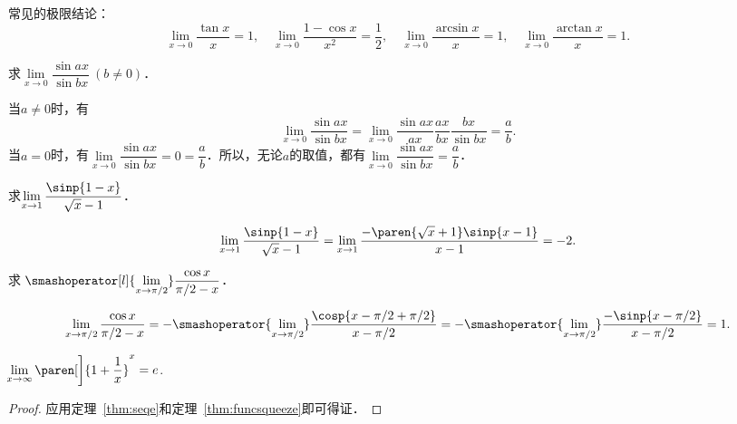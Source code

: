 \begin{example*}
  常见的极限结论：
  \begin{equation*}
    \lim_{x\to0} \frac{\tan x}{x} = 1,
    \quad
    \lim_{x\to0} \frac{1 - \cos x}{x^2} = \frac12,
    \quad
    \lim_{x\to0} \frac{\arcsin x}{x} = 1,
    \quad
    \lim_{x\to0} \frac{\arctan x}{x} = 1.
  \end{equation*}
\end{example*}

\begin{example*}
  求\(\lim\limits_{x\to0} \dfrac{\sin ax}{\sin bx}\ (b \ne 0)\)．

  \begin{remark}
    当\(a \ne 0\)时，有
    \begin{equation*}
      \lim_{x\to0} \frac{\sin ax}{\sin bx}
      = \lim_{x\to0} \frac{\sin ax}{ax} \frac{ax}{bx} \frac{bx}{\sin bx}
      = \frac ab.
    \end{equation*}
    当\(a = 0\)时，有\(\lim\limits_{x\to0} \dfrac{\sin ax}{\sin bx} = 0 = \dfrac ab\)．所以，无论\(a\)的取值，都有\(\lim\limits_{x\to0} \dfrac{\sin ax}{\sin bx} = \dfrac ab\)．
  \end{remark}
\end{example*}

\begin{example*}
  求\(\lim\limits_{x\to1} \dfrac{\sinp{1-x}}{\sqrt x - 1}\)．\rule{0ex}{3.5ex}

  \begin{equation*}
    \lim_{x\to1} \frac{\sinp{1-x}}{\sqrt x - 1}
    = \lim_{x\to1} \frac{-\paren{\sqrt x + 1} \sinp{x-1}}{x - 1}
    = -2.
  \end{equation*}
\end{example*}

\begin{example*}
  求\(\;\smashoperator[l]{\lim\limits_{x\to\pi/2}} \dfrac{\cos x}{\pi/2 - x}\)．\rule{0ex}{3.5ex}

  \begin{equation*}
    \lim_{x\to\pi/2} \frac{\cos x}{\pi/2 - x}
    = - \smashoperator{\lim_{x\to\pi/2}} \frac{\cosp{x-\pi/2+\pi/2}}{x - \pi/2}
    = - \smashoperator{\lim_{x\to\pi/2}} \frac{-\sinp{x-\pi/2}}{x-\pi/2}
    = 1.
  \end{equation*}
\end{example*}

\begin{theorem*}
  \(\!\lim\limits_{x\to\infty} \paren[\bigg]{1 + \dfrac1x}^x = e\).\rule{0ex}{3.5ex}

  \begin{proof}
    应用定理~\ref{thm:seqe}和定理~\ref{thm:funcsqueeze}即可得证．
  \end{proof}
\end{theorem*}

